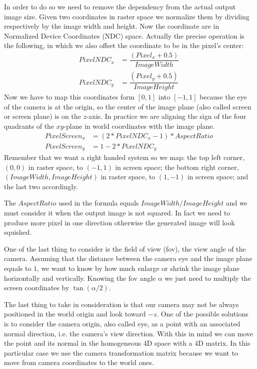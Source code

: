 In order to do so we need to remove the dependency from the actual output image size.
Given two coordinates in raster space we normalize them by dividing respectively by the image width and height.
Now the coordinate are in Normalized Device Coordinates (NDC) space.
Actually the precise operation is the following, in which we also offset the coordinate to be in the pixel's center:
\begin{align*}
  PixelNDC_x &= \dfrac{(Pixel_x + 0.5)}{ImageWidth}\\
  PixelNDC_y &= \dfrac{(Pixel_y + 0.5)}{ImageHeight}
\end{align*}
Now we have to map this coordinates form $[0,1]$ into $[-1,1]$ because the eye of the camera is at the origin, so the center of the image plane (also called screen or screen plane) is on the $z$-axis.
In practice we are aligning the sign of the four quadrants of the $xy$-plane in world coordinates with the image plane.
\begin{align*}
  PixelScreen_x &= (2 * PixelNDC_x - 1) * AspectRatio\\
  PixelScreen_y &= 1 - 2 * PixelNDC_y
\end{align*}
Remember that we want a right handed system so we map:
the top left corner, $(0,0)$ in raster space, to $(-1,1)$ in screen space;
the bottom right corner, $(ImageWidth,ImageHeight)$ in raster space, to $(1,-1)$ in screen space; and the last two accordingly.

The $AspectRatio$ used in the formula equals $ImageWidth / ImageHeight$ and we must consider it when the output image is not squared.
In fact we need to produce more pixel in one direction otherwise the generated image will look squished.

One of the last thing to consider is the field of view (fov), the view angle of the camera.
Assuming that the distance between the camera eye and the image plane equals to $1$, we want to know by how much enlarge or shrink the image plane horizontally and vertically.
Knowing the fov angle $\alpha$ we just need to multiply the screen coordinates by $\tan(\alpha/2)$.

The last thing to take in consideration is that our camera may not be always positioned in the world origin and look toward $-z$.
One of the possible solutions is to consider the camera origin, also called eye, as a point with an associated normal direction, i.e. the camera's view direction.
With this in mind we can move the point and its normal in the homogeneous 4D space with a 4D matrix.
In this particular case we use the camera transformation matrix because we want to move from camera coordinates to the world ones.

